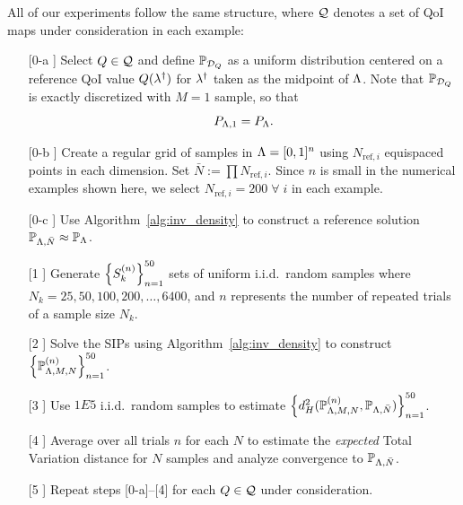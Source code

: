 All of our experiments follow the same structure, where $\mathcal{Q}$ denotes a set of QoI maps under consideration in each example:
\begin{itemize}
\item[[0-a]] Select $Q\in\mathcal{Q}$ and define $\mathbb{P}_{\mathcal{D}_Q}$ as a uniform distribution centered on a reference QoI value $Q(\lambda^\dagger)$ for $\lambda^\dagger$ taken as the midpoint of ${\Lambda}$.
Note that $\mathbb{P}_{\mathcal{D}_Q}$ is exactly discretized with $M=1$ sample, so that
\[
P_{{\Lambda}, 1} = P_{\Lambda}.
\]
\item[[0-b]] Create a regular grid of samples in ${\Lambda}=[0,1]^n$ using $N_{\text{ref},i}$ equispaced points in each dimension.
Set $\bar{N} := \prod N_{\text{ref},i}$.
Since $n$ is small in the numerical examples shown here, we select $N_{\text{ref},i} = 200 \; \forall \; i$ in each example.
\item[[0-c]] Use Algorithm~\ref{alg:inv_density} to construct a reference solution $\mathbb{P}_{{\Lambda},\bar{N}}\approx \mathbb{P}_{\Lambda}$.
\item[[1]] Generate $\left\{S_k^{(n)}\right\}_{n=1}^{50}$ sets of uniform i.i.d.~random samples where $N_k = 25, 50, 100, 200, \hdots, 6400$, and $n$ represents the number of repeated trials of a sample size $N_k$.
\item[[2]] Solve the SIPs using Algorithm~\ref{alg:inv_density} to construct $\left\{\mathbb{P}_{{\Lambda},M,N}^{(n)}\right\}_{n=1}^{50}$.
\item[[3]] Use $1E5$ i.i.d.~random samples to estimate $\left\{d_H^2( \mathbb{P}_{{\Lambda},M,N}^{(n)}, \mathbb{P}_{{\Lambda},\bar{N}})\right\}_{n=1}^{50}$.
\item[[4]] Average over all trials $n$ for each $N$ to estimate the {\em expected} Total Variation distance for $N$ samples and analyze convergence to $\mathbb{P}_{{\Lambda},\bar{N}}$.
\item[[5]] Repeat steps [0-a]--[4] for each $Q\in\mathcal{Q}$ under consideration.
\end{itemize}

\FloatBarrier
